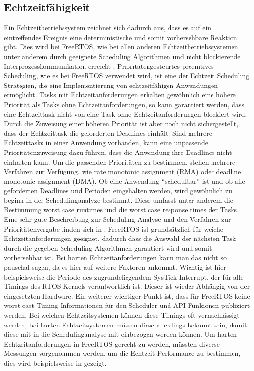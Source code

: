 \subsection{Echtzeitfähigkeit}
Ein Echtzeitbetriebssystem zeichnet sich dadurch aus, dass es auf ein eintreffendes Ereignis eine deterministische und somit vorhersehbare Reaktion gibt. Dies wird bei FreeRTOS, wie bei allen anderen Echtzeitbetriebssystemen unter anderem durch geeignete Scheduling Algorithmen und nicht blockierende Interprozesskommunikation erreicht\cite{9780128015070} \cite{Jones:1997:CRT:269005.266689} \cite{Regehr:2001:ACR:882481.883779}. Prioritätengesteurtes preemtives Scheduling, wie es bei FreeRTOS verwendet wird, ist eine der Echtzeit Scheduling Strategien\cite{9780128015070}, die eine Implementierung von echtzeitfähigen Anwendungen ermöglicht. Tasks mit Echtzeitanforderungen erhalten gewöhnlich eine höhere Priorität als Tasks ohne Echtzeitanforderungen, so kann garantiert werden, dass eine Echtzeittask nicht von eine Task ohne Echtzeitanforderungen blockiert wird. Durch die Zuweisung einer höheren Priorität ist aber noch nicht sichergestellt, dass der Echtzeittask die geforderten Deadlines einhält. 
Sind mehrere Echtzeittasks in einer Anwendung vorhanden, kann eine unpassende Prioritätenzuweisung  dazu führen, dass die Anwendung ihre Deadlines nicht einhalten kann\cite{9780128015070}. Um die passenden Prioritäten zu bestimmen, stehen mehrere Verfahren zur Verfügung, wie rate monotonic assignment (RMA) oder deadline monotonic assignment (DMA). Ob eine Anwendung "`schedulbar"' ist und ob alle geforderten Deadlines und Perioden eingehalten werden, wird gewöhnlich zu beginn in der Schedulinganalyze bestimmt. Diese umfasst unter anderem die Bestimmung worst case runtimes und die worst case response times der Tasks. Eine sehr gute Beschreibung zur Scheduling Analyse und den Verfahren zur Prioritätenvergabe finden sich in \cite{9780128015070}. FreeRTOS ist grundsätzlich für weiche Echtzeitanforderungen geeignet, dadurch dass die Auswahl der nächsten Task durch die gegeben Scheduling Algorithmen garantiert wird und somit vorhersehbar ist. Bei harten Echtzeitanforderungen kann man das nicht so pauschal sagen, da es hier auf weitere Faktoren ankommt. Wichtig ist hier beispielsweise die Periode des zugrundeliegendem SysTick Interrupt, der für alle Timings des RTOS Kernels verantwortlich ist. Dieser ist wieder Abhängig von der eingesetzten Hardware. Ein weiterer wichtiger Punkt ist, dass für FreeRTOS keine worst cast Timing Informationen für den Scheduler und API Funkionen publiziert werden. Bei weichen Echtzeitsystemen können diese Timings oft vernachlässigt werden, bei harten Echtzeitsystemen müssen diese allerdings bekannt sein, damit diese mit in die Schedulinganalyse mit einbezogen werden können. Um harten Echtzeitanforderungen in FreeRTOS gerecht zu werden, müssten diverse Messungen vorgenommen werden, um die Echtzeit-Performance zu bestimmen, dies wird beispielsweise in\cite{RealTimePerformance} gezeigt.     